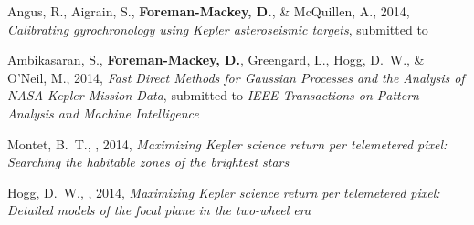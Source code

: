 \item Angus, R., Aigrain, S., {\bf Foreman-Mackey, D.}, \& McQuillen, A., 2014,
    \emph{Calibrating gyrochronology using Kepler asteroseismic targets},
    submitted to \mnras

\item Ambikasaran, S., {\bf Foreman-Mackey, D.}, Greengard, L., Hogg, D.~W.,
    \& O'Neil, M., 2014,
    \emph{Fast Direct Methods for Gaussian Processes and the Analysis of NASA
          Kepler Mission Data},
    submitted to \emph{IEEE Transactions on Pattern Analysis and Machine
        Intelligence}

\item Montet, B.~T., \etal, 2014,
    \emph{Maximizing Kepler science return per telemetered pixel: Searching
          the habitable zones of the brightest stars}

\item Hogg, D.~W., \etal, 2014,
    \emph{Maximizing Kepler science return per telemetered pixel: Detailed
          models of the focal plane in the two-wheel era}

